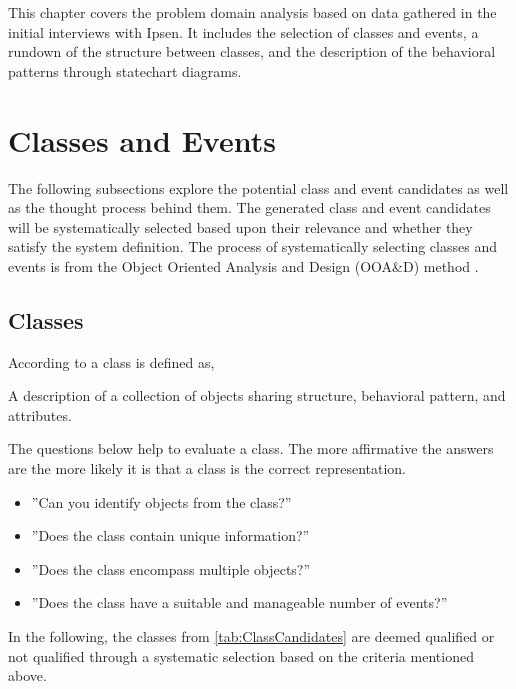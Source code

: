This chapter covers the problem domain analysis based on data gathered in the initial interviews with Ipsen.
It includes the selection of classes and events, a rundown of the structure between classes, and the description of the behavioral patterns through statechart diagrams.

\section{Classes and Events}\label{sec:ClassEvent}
The following subsections explore the potential class and event candidates as well as the thought process behind them.
The generated class and event candidates will be systematically selected based upon their relevance and whether they satisfy the system definition.
The process of systematically selecting classes and events is from the Object Oriented Analysis and Design (OOA\&D) method \cite{Rod-Aalborg}.

\subsection{Classes} \label{sec:Classes}
According to  \citep[p.~55]{Rod-Aalborg} a class is defined as,
\begin{defn}\label{defn:class}
	A description of a collection of objects sharing structure, behavioral pattern, and attributes.
\end{defn}

The questions below help to evaluate a class. The more affirmative the answers are the more likely it is that a class is the correct representation. \citep[p.~63]{Rod-Aalborg}
\begin{itemize}
	\item ''Can you identify objects from the class?''
	\item ''Does the class contain unique information?''
	\item ''Does the class encompass multiple objects?''
	\item ''Does the class have a suitable and manageable number of events?''
\end{itemize}

In the following, the classes from \cref{tab:ClassCandidates} are deemed qualified or not qualified through a systematic selection based on the criteria mentioned above.


